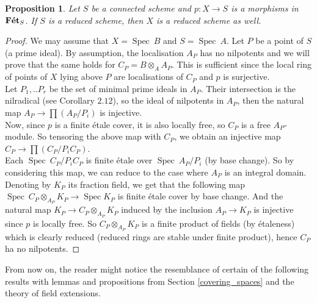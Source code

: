 \documentclass{article}
\theoremstyle{plain}
\newtheorem{proposition}[theorem]{Proposition}
\theoremstyle{definition}
\DeclareMathOperator{\Spec}{Spec}
\DeclareMathOperator{\Fet}{\bf{F\acute{e}t}}
\begin{document}
\begin{proposition}
\label{reduced_carry_above}
    Let $S$ be a connected scheme and $p:X\rightarrow S$ is a morphisms in $\Fet_S$. 
    If $S$ is a reduced scheme, then $X$ is a reduced scheme as well.
\end{proposition}
\begin{proof}
     We may assume that $X= \Spec\:  B$ and $S= \Spec\:A$.
    Let $P$ be a point of $S$ (a prime ideal).
    By assumption, the localisation $A_P$ has no nilpotents and we will prove that the same holds for $C_P = B\otimes_A A_P$.
    This is sufficient since the local ring of points of $X$ lying above $P$ are localisations of $C_P$ and $p$ is surjective.\\
    Let $P_1,..P_r$ be the set of minimal prime ideals in $A_P$.
    Their intersection is the nilradical (see \cite{Eisenbud} Corollary $2.12$), so the ideal of nilpotents in $A_P$, then  the natural map $A_P\rightarrow \prod(A_P/P_i)$ is injective.\\
    Now, since $p$ is a finite \'etale cover, it is also locally free, so $C_P$ is a free $A_P$-module. 
    So tensoring the above map with $C_P$, we obtain an injective map $C_P\rightarrow \prod (C_P/P_iC_P)$.\\
    Each $\Spec\:C_P/P_iC_P$ is finite \'etale over $\Spec\:A_P/P_i$ (by base change). 
    So by considering this map, we can reduce to the case where $A_P$ is an integral domain.
    Denoting by $K_P$ its fraction field, we get that the following map $\Spec\: C_P\otimes_{A_P}K_P\rightarrow \Spec K_P$ is finite \'etale cover by base change.    
    And the natural map $K_P \rightarrow C_P\otimes_{A_P}K_P$ induced by the inclusion $A_P\rightarrow K_P$ is injective since $p$ is locally free.
    So $C_P\otimes_{A_P}K_P$ is a finite product of fields (by \'etaleness) which is clearly reduced (reduced rings are stable under finite product), hence $C_P$ ha no nilpotents.
\end{proof}

 

\noindent From now on, the reader might notice the resemblance of certain of the following results with lemmas and propositions from Section \ref{covering_spaces} and the theory of field extensions.
\end{document}
